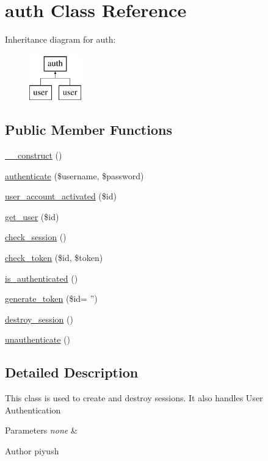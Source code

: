 \hypertarget{classauth}{\section{auth Class Reference}
\label{classauth}
}
Inheritance diagram for auth\-:\begin{figure}[H]
\begin{center}
\leavevmode
\includegraphics[height=2.000000cm]{classauth}
\end{center}
\end{figure}
\subsection*{Public Member Functions}
\begin{DoxyCompactItemize}
\item 
\hyperlink{classauth_a476f6d06e1ddb49cf4268918363c1d99}{\-\_\-\-\_\-construct} ()
\item 
\hyperlink{classauth_a019d664334a621e770043d9fb4210836}{authenticate} (\$username, \$password)
\item 
\hyperlink{classauth_a0de1d4416c9fb04b4223cd7a3dd3a623}{user\-\_\-account\-\_\-activated} (\$id)
\item 
\hyperlink{classauth_aebf5c1995f3314883dc475628db61ccc}{get\-\_\-user} (\$id)
\item 
\hyperlink{classauth_ad5c908efc480a57e5625131348f4bf29}{check\-\_\-session} ()
\item 
\hyperlink{classauth_ac2530bf2bba79e22de7e2f3ebb63be3a}{check\-\_\-token} (\$id, \$token)
\item 
\hyperlink{classauth_a73a5af5d9e12014687cf0d360f5e6356}{is\-\_\-authenticated} ()
\item 
\hyperlink{classauth_a4ec05ca8231cd1151246b127f168d457}{generate\-\_\-token} (\$id= '')
\item 
\hyperlink{classauth_adeb7a80afb02aceb540c541d591baf69}{destroy\-\_\-session} ()
\item 
\hyperlink{classauth_a17089bfa7c3b9d0546f80ac9472dfc7b}{unauthenticate} ()
\end{DoxyCompactItemize}


\subsection{Detailed Description}
This class is used to create and destroy sessions. It also handles User Authentication 
\begin{DoxyParams}{Parameters}
{\em none} & \\
\hline
\end{DoxyParams}
\begin{DoxyAuthor}{Author}
piyush 
\end{DoxyAuthor}


